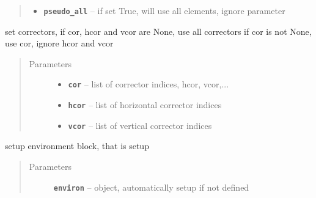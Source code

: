 \documentclass[letterpaper,10pt,english]{sphinxmanual}
\begin{document}
\begin{fulllineitems}
\begin{fulllineitems}
\begin{quote}
\begin{description}
\begin{itemize}
\item {} 
\textbf{\texttt{pseudo\_all}} -- if set True, will use all elements, ignore  parameter

\end{itemize}

\end{description}\end{quote}

\end{fulllineitems}


\begin{fulllineitems}
\label{src/apidocs/genopt:genopt.DakotaOC.set_cors}
set correctors, if cor, hcor and vcor are None, use all correctors
if cor is not None, use cor, ignore hcor and vcor
\begin{quote}\begin{description}
\item[{Parameters}] \leavevmode\begin{itemize}
\item {} 
\textbf{\texttt{cor}} -- list of corrector indices, hcor, vcor,...

\item {} 
\textbf{\texttt{hcor}} -- list of horizontal corrector indices

\item {} 
\textbf{\texttt{vcor}} -- list of vertical corrector indices

\end{itemize}

\end{description}\end{quote}

\end{fulllineitems}


\begin{fulllineitems}
\label{src/apidocs/genopt:genopt.DakotaOC.set_environ}
setup environment block, that is setup 
\begin{quote}\begin{description}
\item[{Parameters}] \leavevmode
\textbf{\texttt{environ}} --  object, automatically setup if not defined


\end{description}
\end{quote}
\end{fulllineitems}
\end{fulllineitems}
\end{document}
